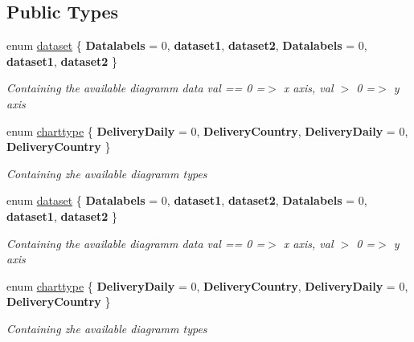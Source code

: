 \subsection*{Public Types}
\begin{DoxyCompactItemize}
\item 
enum \hyperlink{classkpi_mvc_api_1_1_data_transfer_objects_1_1_delivery_data_dto_rs_aae6559e3841d130771a24d8345f9a97c}{dataset} \{ \newline
{\bfseries Datalabels} = 0, 
{\bfseries dataset1}, 
{\bfseries dataset2}, 
{\bfseries Datalabels} = 0, 
\newline
{\bfseries dataset1}, 
{\bfseries dataset2}
 \}\begin{DoxyCompactList}\small\item\em Containing the available diagramm data val == 0 =$>$ x axis, val $>$ 0 =$>$ y axis \end{DoxyCompactList}
\item 
enum \hyperlink{classkpi_mvc_api_1_1_data_transfer_objects_1_1_delivery_data_dto_rs_a09a01f7e378bb8d705847ee3b4fd06f0}{charttype} \{ {\bfseries Delivery\+Daily} = 0, 
{\bfseries Delivery\+Country}, 
{\bfseries Delivery\+Daily} = 0, 
{\bfseries Delivery\+Country}
 \}\begin{DoxyCompactList}\small\item\em Containing zhe available diagramm types \end{DoxyCompactList}
\item 
enum \hyperlink{classkpi_mvc_api_1_1_data_transfer_objects_1_1_delivery_data_dto_rs_aae6559e3841d130771a24d8345f9a97c}{dataset} \{ \newline
{\bfseries Datalabels} = 0, 
{\bfseries dataset1}, 
{\bfseries dataset2}, 
{\bfseries Datalabels} = 0, 
\newline
{\bfseries dataset1}, 
{\bfseries dataset2}
 \}\begin{DoxyCompactList}\small\item\em Containing the available diagramm data val == 0 =$>$ x axis, val $>$ 0 =$>$ y axis \end{DoxyCompactList}
\item 
enum \hyperlink{classkpi_mvc_api_1_1_data_transfer_objects_1_1_delivery_data_dto_rs_a09a01f7e378bb8d705847ee3b4fd06f0}{charttype} \{ {\bfseries Delivery\+Daily} = 0, 
{\bfseries Delivery\+Country}, 
{\bfseries Delivery\+Daily} = 0, 
{\bfseries Delivery\+Country}
 \}\begin{DoxyCompactList}\small\item\em Containing zhe available diagramm types \end{DoxyCompactList}
\end{DoxyCompactItemize}
